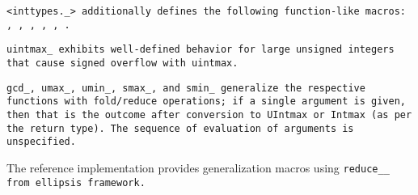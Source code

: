 \tt{<inttypes._>} additionally defines the following function-like macros:
, , , , , .

\tt{uintmax_} exhibits well-defined behavior for large
unsigned integers that cause signed overflow with \tt{uintmax}.

\tt{gcd_}, \tt{umax_}, \tt{umin_}, \tt{smax_}, and \tt{smin_}
generalize the respective functions with fold/reduce operations;
if a single argument is given, then that is the outcome after
conversion to \tt{UIntmax} or \tt{Intmax} (as per the return type).
The sequence of evaluation of arguments is unspecified.

\note The reference implementation provides generalization
macros using \tt{reduce__} from ellipsis framework.
